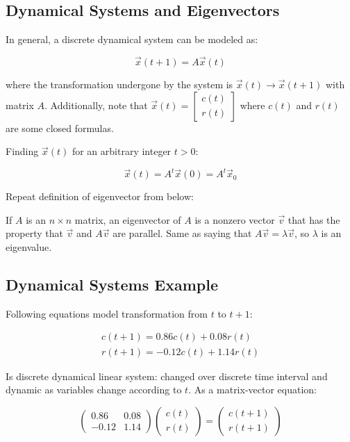 \subsection{Dynamical Systems and Eigenvectors}

In general, a discrete dynamical system can be modeled as:

\[\boxed{\vec{x}(t+1)=A\vec{x}(t)}\]

where the transformation undergone by the system is $\vec{x}(t)\rightarrow\vec{x}(t+1)$ with matrix $A$.
Additionally, note that $\vec{x}(t)=\begin{bmatrix}c(t)\\r(t)\end{bmatrix}$ where $c(t)$ and $r(t)$ are some closed formulas.

Finding $\vec{x}(t)$ for an arbitrary integer $t>0$:

\[\boxed{\vec{x}(t)=A^t\vec{x}(0)=A^t\vec{x}_0}\]

Repeat definition of eigenvector from below:

\begin{framed}
    If $A$ is an $n\times n$ matrix, an eigenvector of $A$ is a nonzero vector $\vec{v}$
    that has the property that $\vec{v}$ and $A\vec{v}$ are parallel.
    Same as saying that $A\vec{v}=\lambda\vec{v}$, so $\lambda$ is an eigenvalue.
\end{framed}

\subsection{Dynamical Systems Example}

Following equations model transformation from $t$ to $t+1$:

\[\boxed{
    \begin{array}{l}
        c(t+1)=0.86 c(t)+0.08 r(t) \\
        r(t+1)=-0.12 c(t)+1.14 r(t)
        \end{array}
}\]

Is discrete dynamical linear system: changed over discrete time interval and dynamic as
variables change according to $t$. As a matrix-vector equation:

\[\left(\begin{array}{cc}
    0.86 & 0.08 \\
    -0.12 & 1.14
    \end{array}\right)\left(\begin{array}{l}
    c(t) \\
    r(t)
    \end{array}\right)=\left(\begin{array}{l}
    c(t+1) \\
    r(t+1)
    \end{array}\right)\]

